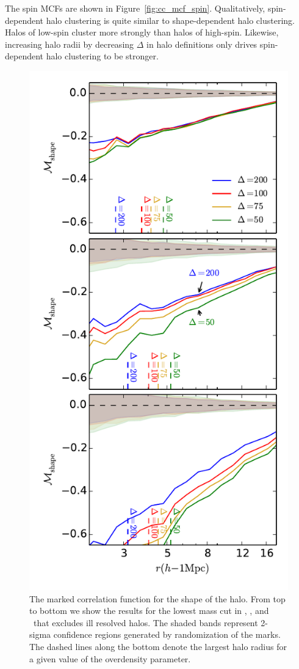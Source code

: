 \documentclass[usenatbib,usegraphicx,letterpaper]{mn2e}
\begin{document}
The spin MCFs are shown in Figure~\ref{fig:cc_mcf_spin}. Qualitatively, spin-dependent halo clustering is 
quite similar to shape-dependent halo clustering. Halos of low-spin cluster more strongly than halos of 
high-spin.  Likewise, increasing halo radii by decreasing $\Delta$ in halo definitions only drives 
spin-dependent halo clustering to be stronger.

\begin{figure}
	\centering
	\includegraphics[width=.4\textwidth]{all_mcf_s_z00_cutcomp.pdf}
	\caption{
	The marked correlation function for the shape of the halo. From top to bottom we show the results for the lowest mass cut in \simA, \simB, and \simC \ that excludes ill resolved halos. The shaded bands represent 2-sigma confidence regions generated by randomization of the marks. The dashed lines along the bottom denote the largest halo radius for a given value of the overdensity parameter.
}
	\label{fig:cc_mcf_s}
\end{figure}
\end{document}

